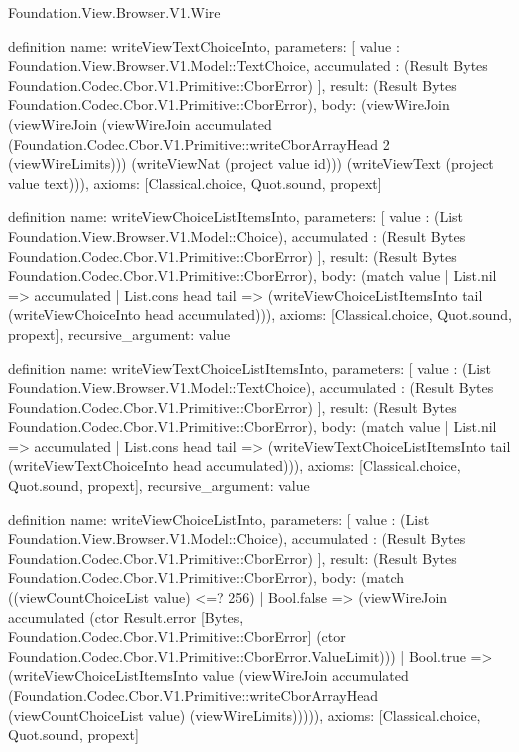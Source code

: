 \begin{lexlean}{Foundation.View.Browser.V1.Wire}
\begin{semanticmodule}
definition{
  name: writeViewTextChoiceInto,
  parameters: [
    value : Foundation.View.Browser.V1.Model::TextChoice,
    accumulated : (Result Bytes Foundation.Codec.Cbor.V1.Primitive::CborError)
  ],
  result: (Result Bytes Foundation.Codec.Cbor.V1.Primitive::CborError),
  body: (viewWireJoin (viewWireJoin (viewWireJoin accumulated (Foundation.Codec.Cbor.V1.Primitive::writeCborArrayHead 2 (viewWireLimits))) (writeViewNat (project value id))) (writeViewText (project value text))),
  axioms: [Classical.choice, Quot.sound, propext]
}

definition{
  name: writeViewChoiceListItemsInto,
  parameters: [
    value : (List Foundation.View.Browser.V1.Model::Choice),
    accumulated : (Result Bytes Foundation.Codec.Cbor.V1.Primitive::CborError)
  ],
  result: (Result Bytes Foundation.Codec.Cbor.V1.Primitive::CborError),
  body: (match value
    | List.nil => accumulated
    | List.cons head tail => (writeViewChoiceListItemsInto tail (writeViewChoiceInto head accumulated))),
  axioms: [Classical.choice, Quot.sound, propext],
  recursive_argument: value
}

definition{
  name: writeViewTextChoiceListItemsInto,
  parameters: [
    value : (List Foundation.View.Browser.V1.Model::TextChoice),
    accumulated : (Result Bytes Foundation.Codec.Cbor.V1.Primitive::CborError)
  ],
  result: (Result Bytes Foundation.Codec.Cbor.V1.Primitive::CborError),
  body: (match value
    | List.nil => accumulated
    | List.cons head tail => (writeViewTextChoiceListItemsInto tail (writeViewTextChoiceInto head accumulated))),
  axioms: [Classical.choice, Quot.sound, propext],
  recursive_argument: value
}

definition{
  name: writeViewChoiceListInto,
  parameters: [
    value : (List Foundation.View.Browser.V1.Model::Choice),
    accumulated : (Result Bytes Foundation.Codec.Cbor.V1.Primitive::CborError)
  ],
  result: (Result Bytes Foundation.Codec.Cbor.V1.Primitive::CborError),
  body: (match ((viewCountChoiceList value) <=? 256)
    | Bool.false => (viewWireJoin accumulated (ctor Result.error [Bytes, Foundation.Codec.Cbor.V1.Primitive::CborError] (ctor Foundation.Codec.Cbor.V1.Primitive::CborError.ValueLimit)))
    | Bool.true => (writeViewChoiceListItemsInto value (viewWireJoin accumulated (Foundation.Codec.Cbor.V1.Primitive::writeCborArrayHead (viewCountChoiceList value) (viewWireLimits))))),
  axioms: [Classical.choice, Quot.sound, propext]
}


\end{semanticmodule}
\end{lexlean}
